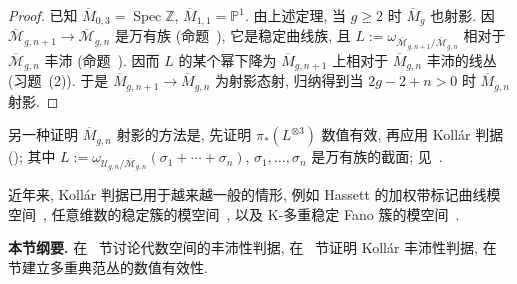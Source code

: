 \begin{proof}
已知 $\overline M_{0,\allowbreak 3}=\operatorname{Spec}\mathbb Z$, $\overline M_{1,\allowbreak 1}=\mathbb P^1$. 由上述定理, 当 $g\geq2$ 时 $\overline M_g$ 也射影. 因 $\overline{\mathcal M}_{g,\allowbreak n+1}\to\overline{\mathcal M}_{g,\allowbreak n}$ 是万有族 (命题~), 它是稳定曲线族, 且 $L:=\omega_{\overline{\mathcal M}_{g,\allowbreak n+1}/\overline{\mathcal M}_{g,\allowbreak n}}$ 相对于 $\overline{\mathcal M}_{g,\allowbreak n}$ 丰沛 (命题~). 因而 $L$ 的某个幂下降为 $\overline M_{g,\allowbreak n+1}$ 上相对于 $\overline M_{g,\allowbreak n}$ 丰沛的线丛 (习题~(2)). 于是 $\overline M_{g,\allowbreak n+1}\to\overline M_{g,\allowbreak n}$ 为射影态射, 归纳得到当 $2g-2+n>0$ 时 $\overline M_{g,\allowbreak n}$ 射影.
\end{proof}
\begin{remark}\label{src:6.9.6}
另一种证明 $\overline M_{g,\allowbreak n}$ 射影的方法是, 先证明 $\pi_*(L^{\otimes3})$ 数值有效, 再应用 Kollár 判据 (); 其中 $L:=\omega_{\mathcal U_{g,\allowbreak n}/\overline{\mathcal M}_{g,\allowbreak n}}(\sigma_1+\cdots+\sigma_n)$, $\sigma_1,\allowbreak \ldots,\allowbreak \sigma_n$ 是万有族的截面; 见~\cite[命题 4.7]{Kol90}.
\end{remark}
近年来, Kollár 判据已用于越来越一般的情形, 例如 Hassett 的加权带标记曲线模空间~\cite{Has03}, 任意维数的稳定簇的模空间~\cite{KP17}, 以及 K-多重稳定 Fano 簇的模空间~\cite{CP21a,XZ20a}.

\noindent\textbf{本节纲要.} 在~ 节讨论代数空间的丰沛性判据, 在~ 节证明 Kollár 丰沛性判据, 在~ 节建立多重典范丛的数值有效性.

